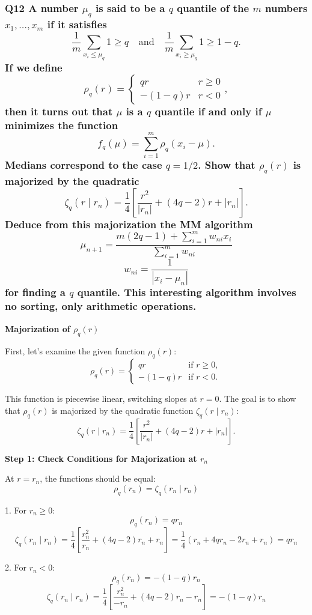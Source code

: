 \documentclass[8pt]{article}
\begin{document}
\subsubsection*{Q12 A number \(\mu_q\) is said to be a \(q\) quantile of the \(m\) numbers \(x_1, \ldots, x_m\) if it satisfies
\[
\frac{1}{m} \sum_{x_i \leq \mu_q} 1 \geq q \quad \text{and} \quad \frac{1}{m} \sum_{x_i \geq \mu_q} 1 \geq 1 - q.
\]
If we define
\[
\rho_q(r) = \begin{cases} 
qr & r \geq 0 \\ 
-(1 - q)r & r < 0 
\end{cases},
\]
then it turns out that \(\mu\) is a \(q\) quantile if and only if \(\mu\) minimizes the function
\[
f_q(\mu) = \sum_{i=1}^m \rho_q(x_i - \mu).
\]
Medians correspond to the case \(q = 1/2\). Show that \(\rho_q(r)\) is majorized by the quadratic
\[
\zeta_q(r \mid r_n) = \frac{1}{4} \left[ \frac{r^2}{|r_n|} + (4q - 2)r + |r_n| \right].
\]
Deduce from this majorization the MM algorithm
\[
\mu_{n+1} = \frac{m(2q - 1) + \sum_{i=1}^m w_{ni} x_i}{\sum_{i=1}^m w_{ni}}
\]
\[
w_{ni} = \frac{1}{|x_i - \mu_n|}
\]
for finding a \(q\) quantile. This interesting algorithm involves no sorting, only arithmetic operations.}

\textbf{Majorization of \(\rho_q(r)\)}

First, let's examine the given function \(\rho_q(r)\):
\[
\rho_q(r) = \begin{cases} 
qr & \text{if } r \geq 0, \\ 
-(1 - q)r & \text{if } r < 0.
\end{cases}
\]

This function is piecewise linear, switching slopes at \(r = 0\). The goal is to show that \(\rho_q(r)\) is majorized by the quadratic function \(\zeta_q(r \mid r_n)\):
\[
\zeta_q(r \mid r_n) = \frac{1}{4} \left[ \frac{r^2}{|r_n|} + (4q - 2)r + |r_n| \right].
\]

\textbf{Step 1: Check Conditions for Majorization at \(r_n\)}

At \(r = r_n\), the functions should be equal:
\[
\rho_q(r_n) = \zeta_q(r_n \mid r_n)
\]

1. For \(r_n \geq 0\):
   \[
   \rho_q(r_n) = qr_n
   \]
   \[
   \zeta_q(r_n \mid r_n) = \frac{1}{4} \left[ \frac{r_n^2}{r_n} + (4q - 2)r_n + r_n \right] = \frac{1}{4} (r_n + 4qr_n - 2r_n + r_n) = qr_n
   \]

2. For \(r_n < 0\):
   \[
   \rho_q(r_n) = -(1-q)r_n
   \]
   \[
   \zeta_q(r_n \mid r_n) = \frac{1}{4} \left[ \frac{r_n^2}{-r_n} + (4q - 2)r_n - r_n \right] = -(1-q)r_n
   \]
\end{document}
